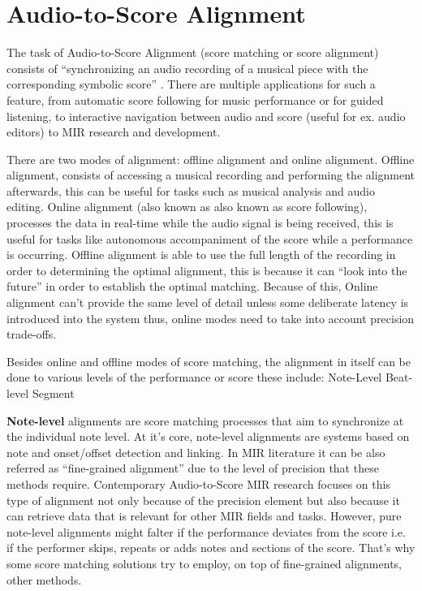 \section{Audio-to-Score Alignment}
The task of Audio-to-Score Alignment (score matching or score alignment) consists of ``synchronizing an audio recording of a musical piece with the corresponding symbolic score'' \citep{carabias-ortiAUDIOSCOREALIGNMENTa}. There are multiple applications for such a feature, from automatic score following for music performance or for guided listening, to interactive navigation between audio and score (useful for ex. audio editors) to MIR research and development. 

There are two modes of alignment: offline alignment and online alignment. Offline alignment, consists of accessing a musical recording and performing the alignment afterwards, this can be useful for tasks such as musical analysis and audio editing. Online alignment (also known as also known as score following), processes the data in real-time while the audio signal is being received, this is useful for tasks like autonomous accompaniment of the score while a performance is occurring. Offline alignment is able to use the full length of the recording in order to determining the optimal alignment, this is because it can ``look into the future'' in order to establish the optimal matching. Because of this, Online alignment can't provide the same level of detail unless some deliberate latency is introduced into the system thus, online modes need to take into account precision trade-offs.  

Besides online and offline modes of score matching, the alignment in itself can be done to various levels of the performance or score these include:
  Note-Level
  Beat-level
  Segment 

\textbf{Note-level} alignments are score matching processes that aim to synchronize at the individual note level. At it's core, note-level alignments are systems based on note and onset/offset detection and linking. In MIR literature it can be also referred as ``fine-grained alignment'' due to the level of precision that these methods require. Contemporary Audio-to-Score MIR research focuses on this type of alignment not only because of the precision element but also because it can retrieve data that is relevant for other MIR fields and tasks. However, pure note-level alignments might falter if the performance deviates from the score i.e. if the performer skips, repeats or adds notes and sections of the score. That's why some score matching solutions try to employ, on top of fine-grained alignments, other methods.

